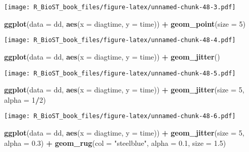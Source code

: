 \documentclass[
]{book}
\newenvironment{Shaded}{\begin{snugshade}}{\end{snugshade}}
\newcommand{\DataTypeTok}[1]{\textcolor[rgb]{0.13,0.29,0.53}{#1}}
\newcommand{\DecValTok}[1]{\textcolor[rgb]{0.00,0.00,0.81}{#1}}
\newcommand{\FloatTok}[1]{\textcolor[rgb]{0.00,0.00,0.81}{#1}}
\newcommand{\KeywordTok}[1]{\textcolor[rgb]{0.13,0.29,0.53}{\textbf{#1}}}
\newcommand{\NormalTok}[1]{#1}
\newcommand{\OperatorTok}[1]{\textcolor[rgb]{0.81,0.36,0.00}{\textbf{#1}}}
\newcommand{\StringTok}[1]{\textcolor[rgb]{0.31,0.60,0.02}{#1}}
\begin{document}
\texttt{[image: R\_BioST\_book\_files/figure-latex/unnamed-chunk-48-3.pdf]}

\begin{Shaded}
\begin{Highlighting}[]
\KeywordTok{ggplot}\NormalTok{(}\DataTypeTok{data =}\NormalTok{ dd, }\KeywordTok{aes}\NormalTok{(}\DataTypeTok{x =}\NormalTok{ diagtime, }\DataTypeTok{y =}\NormalTok{ time)) }\OperatorTok{+}\StringTok{ }
\StringTok{  }\KeywordTok{geom\_point}\NormalTok{(}\DataTypeTok{size =} \DecValTok{5}\NormalTok{)}
\end{Highlighting}
\end{Shaded}

\texttt{[image: R\_BioST\_book\_files/figure-latex/unnamed-chunk-48-4.pdf]}

\begin{Shaded}
\begin{Highlighting}[]
\KeywordTok{ggplot}\NormalTok{(}\DataTypeTok{data =}\NormalTok{ dd, }\KeywordTok{aes}\NormalTok{(}\DataTypeTok{x =}\NormalTok{ diagtime, }\DataTypeTok{y =}\NormalTok{ time)) }\OperatorTok{+}\StringTok{ }
\StringTok{  }\KeywordTok{geom\_jitter}\NormalTok{() }
\end{Highlighting}
\end{Shaded}

\texttt{[image: R\_BioST\_book\_files/figure-latex/unnamed-chunk-48-5.pdf]}

\begin{Shaded}
\begin{Highlighting}[]
\KeywordTok{ggplot}\NormalTok{(}\DataTypeTok{data =}\NormalTok{ dd, }\KeywordTok{aes}\NormalTok{(}\DataTypeTok{x =}\NormalTok{ diagtime, }\DataTypeTok{y =}\NormalTok{ time)) }\OperatorTok{+}\StringTok{ }
\StringTok{  }\KeywordTok{geom\_jitter}\NormalTok{(}\DataTypeTok{size =} \DecValTok{5}\NormalTok{, }\DataTypeTok{alpha =} \DecValTok{1}\OperatorTok{/}\DecValTok{2}\NormalTok{) }
\end{Highlighting}
\end{Shaded}

\texttt{[image: R\_BioST\_book\_files/figure-latex/unnamed-chunk-48-6.pdf]}

\begin{Shaded}
\begin{Highlighting}[]
\KeywordTok{ggplot}\NormalTok{(}\DataTypeTok{data =}\NormalTok{ dd, }\KeywordTok{aes}\NormalTok{(}\DataTypeTok{x =}\NormalTok{ diagtime, }\DataTypeTok{y =}\NormalTok{ time)) }\OperatorTok{+}\StringTok{ }
\StringTok{  }\KeywordTok{geom\_jitter}\NormalTok{(}\DataTypeTok{size =} \DecValTok{5}\NormalTok{, }\DataTypeTok{alpha =} \FloatTok{0.3}\NormalTok{) }\OperatorTok{+}\StringTok{ }
\StringTok{  }\KeywordTok{geom\_rug}\NormalTok{(}\DataTypeTok{col =} \StringTok{"steelblue"}\NormalTok{, }\DataTypeTok{alpha =} \FloatTok{0.1}\NormalTok{, }\DataTypeTok{size =} \FloatTok{1.5}\NormalTok{)}
\end{Highlighting}
\end{Shaded}
\end{document}
